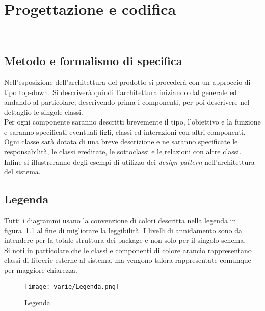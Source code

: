 
\chapter{Progettazione e codifica}
\label{cap:progettazione-codifica}

\\


\section{Metodo e formalismo di specifica}
Nell'esposizione dell'architettura del prodotto si procederà con un approccio di tipo top-down.  Si descriverà quindi l'architettura iniziando dal generale ed andando al particolare; descrivendo prima i componenti, per poi descrivere nel dettaglio le singole classi.\\

Per ogni componente saranno descritti brevemente il tipo, l'obiettivo e la funzione e saranno specificati
eventuali figli, classi ed interazioni con altri componenti. Ogni classe sarà dotata di una breve descrizione e
ne saranno specificate le responsabilità, le classi ereditate, le sottoclassi e le relazioni con altre classi.\\
Infine si illustreranno degli esempi di utilizzo dei \emph{design pattern} nell'architettura del sistema.

\section{Legenda}
Tutti i diagrammi usano la convenzione di colori descritta nella legenda in figura~\ref{fig:legenda} al fine di migliorare la leggibilità. I livelli di annidamento sono da intendere per la totale struttura dei package e non solo per il singolo schema.\\
Si noti in particolare che le classi e componenti di colore arancio rappresentano classi di librerie esterne al sistema, ma vengono talora rappresentate comunque per maggiore chiarezza.
\begin{figure}[H] 
    \centering 
    \texttt{[image: varie/Legenda.png]} 
    \caption{Legenda}\label{fig:legenda}
\end{figure}



